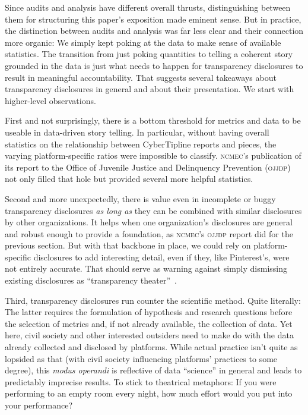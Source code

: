 \documentclass[nonacm,screen]{acmart}
\newcommand\V[1]{\textsc{\MakeLowercase{#1}}}
\begin{document}
\begin{itemize}
{Since audits and analysis have different overall thrusts, distinguishing between
them for structuring this paper's exposition made eminent sense. But in
practice, the distinction between audits and analysis was far less clear and
their connection more organic: We simply kept poking at the data to make sense
of available statistics. The transition from just poking quantities to telling a
coherent story grounded in the data is just what needs to happen for
transparency disclosures to result in meaningful accountability. That suggests
several takeaways about transparency disclosures in general and about their
presentation. We start with higher-level observations.

First and not surprisingly, there is a bottom threshold for metrics and data to
be useable in data-driven story telling. In particular, without having overall
statistics on the relationship between CyberTipline reports and pieces, the
varying platform-specific ratios were impossible to classify. \V{NCMEC}'s
publication of its report to the Office of Juvenile Justice and Delinquency
Prevention (\V{OJJDP}) not only filled that hole but provided several more
helpful statistics.

Second and more unexpectedly, there is value even in incomplete or buggy
transparency disclosures \emph{as long as} they can be combined with similar
disclosures by other organizations. It helps when one organization's disclosures
are general and robust enough to provide a foundation, as \V{NCMEC}'s \V{OJJDP}
report did for the previous section. But with that backbone in place, we could
rely on platform-specific disclosures to add interesting detail, even if they,
like Pinterest's, were not entirely accurate. That should serve as warning
against simply dismissing existing disclosures as ``transparency
theater''~\cite{Douek2022}.

Third, transparency disclosures run counter the scientific method. Quite
literally: The latter requires the formulation of hypothesis and research
questions before the selection of metrics and, if not already available, the
collection of data. Yet here, civil society and other interested outsiders need
to make do with the data already collected and disclosed by platforms. While
actual practice isn't quite as lopsided as that (with civil society influencing
platforms' practices to some degree), this \emph{modus operandi} is reflective
of data ``science'' in general and leads to predictably imprecise results. To
stick to theatrical metaphors: If you were performing to an empty room every
night, how much effort would you put into your performance?

}
\end{itemize}
\end{document}
